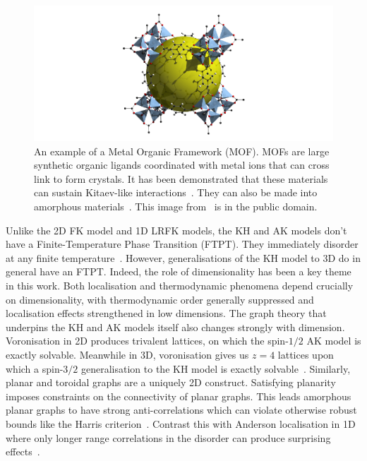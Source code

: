 \hypertarget{fig:mof}{%
\begin{figure}
\centering
\includegraphics[width=1\textwidth,height=\textheight]{figure_code/conclusion/mof}
\caption[{Example of a Metal Organic Framework}]{An example of a Metal Organic Framework (MOF). MOFs are large synthetic organic ligands coordinated with metal ions that can cross link to form crystals. It has been demonstrated that these materials can sustain Kitaev-like interactions~\autocite{yamadaDesigningKitaevSpin2017}. They can also be made into amorphous materials~\autocite{bennett2014amorphous}. This image from~\autocite{rosiHydrogenStorageMicroporous2003} is in the public domain.}
\label{fig:mof}
\end{figure}
}

Unlike the 2D FK model and 1D LRFK models, the KH and AK models don't have a Finite-Temperature Phase Transition (FTPT). They immediately disorder at any finite temperature~\autocite{eschmannThermodynamicClassificationThreedimensional2020}. However, generalisations of the KH model to 3D do in general have an FTPT. Indeed, the role of dimensionality has been a key theme in this work. Both localisation and thermodynamic phenomena depend crucially on dimensionality, with thermodynamic order generally suppressed and localisation effects strengthened in low dimensions. The graph theory that underpins the KH and AK models itself also changes strongly with dimension. Voronisation in 2D produces trivalent lattices, on which the spin-\(1/2\) AK model is exactly solvable. Meanwhile in 3D, voronisation gives us \(z=4\) lattices upon which a spin-\(3/2\) generalisation to the KH model is exactly solvable~\autocite{yaoAlgebraicSpinLiquid2009,wenQuantumOrderStringnet2003,ryuThreedimensionalTopologicalPhase2009}. Similarly, planar and toroidal graphs are a uniquely 2D construct. Satisfying planarity imposes constraints on the connectivity of planar graphs. This leads amorphous planar graphs to have strong anti-correlations which can violate otherwise robust bounds like the Harris criterion~\autocite{harrisEffectRandomDefects1974}. Contrast this with Anderson localisation in 1D where only longer range correlations in the disorder can produce surprising effects~\autocite{aubryAnalyticityBreakingAnderson1980,dassarmaLocalizationMobilityEdges1990,dunlapAbsenceLocalizationRandomdimer1990,izrailevLocalizationMobilityEdge1999,croyAndersonLocalization1D2011,izrailevAnomalousLocalizationLowDimensional2012}.

